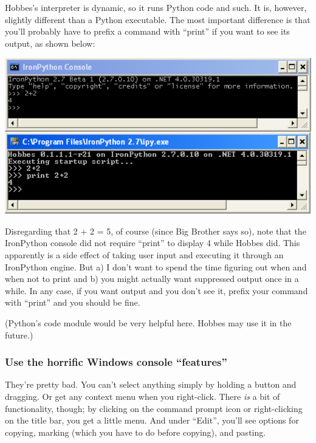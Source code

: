 Hobbes's interpreter is dynamic, so it runs Python code and such. It is, however, slightly different than a Python executable. The most important difference is that you'll probably have to prefix a command with ``print'' if you want to see its output, as shown below:

\begin{center}
\includegraphics[scale=1]{interpreterdiff.pdf}
\end{center}

Disregarding that 2 + 2 = 5, of course (since Big Brother says so), note that the IronPython console did not require ``print'' to display 4 while Hobbes did. This apparently is a side effect of taking user input and executing it through an IronPython engine. But a) I don't want to spend the time figuring out when and when not to print and b) you might actually want suppressed output once in a while. In any case, if you want output and you don't see it, prefix your command with ``print'' and you should be fine.

(Python's code module would be very helpful here. Hobbes may use it in the future.)



%
%
\subsubsection{Use the horrific Windows console ``features''}
\label{3.1.1}

They're pretty bad. You can't select anything simply by holding a button and dragging. Or get any context menu when you right-click. There \emph{is} a bit of functionality, though; by clicking on the command prompt icon or right-clicking on the title bar, you get a little menu. And under ``Edit'', you'll see options for copying, marking (which you have to do before copying), and pasting.



